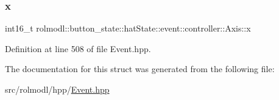 \subsubsection{\texorpdfstring{x}{x}}
{\footnotesize\ttfamily int16\+\_\+t rolmodl\+::button\+\_\+state\+::hat\+State\+::event\+::controller\+::\+Axis\+::x}



Definition at line 508 of file Event.\+hpp.



The documentation for this struct was generated from the following file\+:\begin{DoxyCompactItemize}
\item 
src/rolmodl/hpp/\mbox{\hyperlink{_event_8hpp}{Event.\+hpp}}\end{DoxyCompactItemize}
